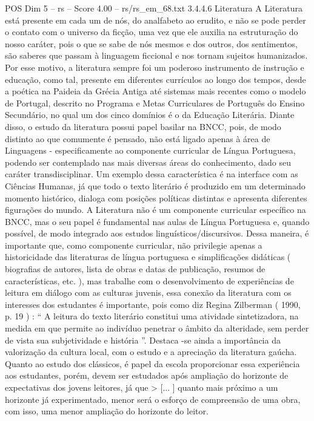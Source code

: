 \begin{textsample}{POS Dim 5 – rs – Score 4.00 – rs/rs\_em\_68.txt}  \label{ex:f5_pos_266}
3.4.4.6 Literatura A Literatura está presente em cada um de nós, do analfabeto ao erudito, e não se pode perder o contato com o universo da ficção, uma vez que ele auxilia na estruturação do nosso caráter, pois o que se sabe de nós mesmos e dos outros, dos sentimentos, são saberes que passam à linguagem ficcional e nos tornam sujeitos humanizados.
Por esse motivo, a literatura sempre foi um poderoso instrumento de instrução e educação, como tal, presente em diferentes currículos ao longo dos tempos, desde a poética na Paideia da Grécia Antiga até sistemas mais recentes como o modelo de Portugal, descrito no Programa e Metas Curriculares de Português do Ensino Secundário, no qual um dos cinco domínios é o da Educação Literária.
Diante disso, o estudo da literatura possui papel basilar na BNCC, pois, de modo distinto ao que comumente é pensado, não está ligado apenas à área de Linguagens - especificamente ao componente curricular de Língua Portuguesa, podendo ser contemplado nas mais diversas áreas do conhecimento, dado seu caráter transdisciplinar.
Um exemplo dessa característica é na interface com as Ciências Humanas, já que todo o texto literário é produzido em um determinado momento histórico, dialoga com posições políticas distintas e apresenta diferentes figurações do mundo.
A Literatura não é um componente curricular específico na BNCC, mas o seu papel é fundamental nas aulas de Língua Portuguesa e, quando possível, de modo integrado aos estudos linguísticos/discursivos.
Dessa maneira, é importante que, como componente curricular, não privilegie apenas a historicidade das literaturas de língua portuguesa e simplificações didáticas ( biografias de autores, lista de obras e datas de publicação, resumos de características, etc. ), mas trabalhe com o desenvolvimento de experiências de leitura em diálogo com as culturas juvenis, essa conexão da literatura com os interesses dos estudantes é importante, pois como diz Regina Zilberman ( 1990, p. 19 ) : “ A leitura do texto literário constitui uma atividade sintetizadora, na medida em que permite ao indivíduo penetrar o âmbito da alteridade, sem perder de vista sua subjetividade e história ”.
Destaca -se ainda a importância da valorização da cultura local, com o estudo e a apreciação da literatura gaúcha.
Quanto ao estudo dos clássicos, é papel da escola proporcionar essa experiência aos estudantes, porém, devem ser estudados após ampliação do horizonte de expectativas dos jovens leitores, já que > [... ] quanto mais próximo a um horizonte já experimentado, menor será o esforço de compreensão de uma obra, com isso, uma menor ampliação do horizonte do leitor.

\end{textsample}
